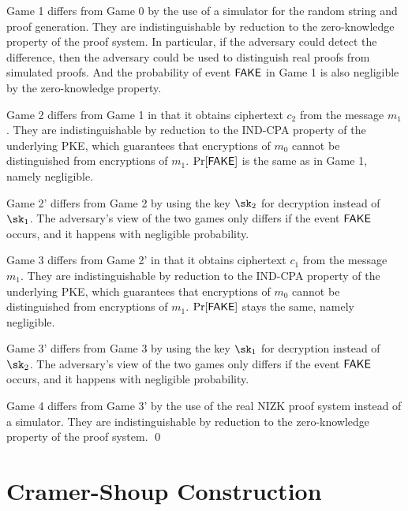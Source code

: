 \documentclass[12pt]{tufte-book}
\begin{document}
Game 1 differs from Game 0 by the use of a simulator for the random string and proof generation.
They are indistinguishable by reduction to the zero-knowledge property of the proof system.
In particular, if the adversary could detect the difference, then the adversary could be used to distinguish real proofs from simulated proofs.
And the probability of event $\mathsf{FAKE}$ in Game 1 is also negligible by the
zero-knowledge property.

Game 2 differs from Game 1 in that it obtains ciphertext $c_2$ from the message $m_1$.
They are indistinguishable by reduction to the IND-CPA property of the underlying PKE,
which guarantees that encryptions of $m_0$ cannot be distinguished from encryptions of $m_1$.
$\Pr[\mathsf{FAKE}]$ is the same as in Game 1, namely negligible.

Game 2' differs from Game 2 by using the key $\sk_2$ for decryption instead of $\sk_1$.
The adversary's view of the two games only differs if the event $\mathsf{FAKE}$ occurs, and it happens with
negligible probability.

Game 3 differs from Game 2' in that it obtains ciphertext $c_1$ from the message $m_1$.
They are indistinguishable by reduction to the IND-CPA property of the underlying PKE,
which guarantees that encryptions of $m_0$ cannot be distinguished from encryptions of $m_1$.
$\Pr[\mathsf{FAKE}]$ stays the same, namely negligible.

Game 3' differs from Game 3 by using the key $\sk_1$ for decryption instead of $\sk_2$.
The adversary's view of the two games only differs if the event $\mathsf{FAKE}$ occurs, and it happens with
negligible probability.

Game 4 differs from Game 3' by the use of the real NIZK proof system instead of a simulator.
They are indistinguishable by reduction to the zero-knowledge property of the proof system.
\qed


\fi
\section{Cramer-Shoup Construction}




\backmatter





\end{document}
